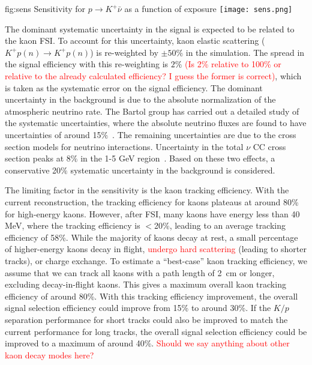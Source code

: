 \begin{dunefigure}
{fig:sens}
{Sensitivity for $p\rightarrow K^{+} \bar{\nu}$ as a function of exposure}
\texttt{[image: sens.png]}
\end{dunefigure} 

The dominant systematic uncertainty in the signal is expected to be related to the kaon FSI. To account for this uncertainty, kaon elastic scattering ($K^{+}p(n)\rightarrow K^{+}p(n)$) is re-weighted by $\pm 50\%$ in the simulation. The spread in the signal efficiency with this re-weighting is $2\%$ \textcolor{red}{(Is 2\% relative to 100\% or relative to the already calculated efficiency? I guess the former is correct)}, which is taken as the  systematic error on the signal efficiency.
The dominant uncertainty in the background 
is due to the absolute normalization of the atmospheric neutrino rate. The Bartol group has carried out a detailed study of the systematic uncertainties, where the absolute neutrino fluxes are found to have uncertainties of around 15$\%$~\cite{Barr:2006it}.
The remaining uncertainties are due to the cross section models for neutrino interactions. Uncertainty in the total $\nu$ CC cross section peaks at 8$\%$ in the 1-5 GeV region~\cite{Adamson:2012gt}.
Based on these two effects, a conservative 20$\%$ systematic uncertainty in the background is considered.

The limiting factor in the sensitivity is the kaon tracking efficiency.  With the current reconstruction, the tracking efficiency for kaons plateaus at around 80\% for high-energy kaons.  However, after FSI, many kaons have energy less than 40 MeV, where the tracking efficiency is $<$20\%, leading to an 
average tracking efficiency of 58\%.   
While the majority of kaons decay at rest, a small percentage of higher-energy kaons decay in flight, \textcolor{red}{undergo hard scattering} 
(leading to shorter tracks), or charge exchange.  To estimate a ``best-case'' kaon tracking efficiency, we assume that we can track all kaons with a path length of 2~cm or longer, excluding decay-in-flight kaons.  This gives a maximum overall kaon tracking efficiency of around 80\%.  With this tracking efficiency improvement, the overall signal selection efficiency could improve from 15\% to around 30\%.  If the $K/p$ separation performance for short tracks could also be improved to match the current performance for long tracks, the overall signal selection efficiency could be improved to a maximum of around 40\%. \textcolor{red}{Should we say anything about other kaon decay modes here?} 


